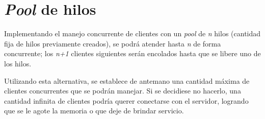 \section{\emph{Pool} de hilos}

Implementando el manejo concurrente de clientes con un \emph{pool} de \emph{n} hilos (cantidad fija de hilos previamente creados), se podrá atender hasta \emph{n} de forma concurrente; los \emph{n+1} clientes siguientes serán encolados hasta que se libere uno de los hilos. 

Utilizando esta alternativa, se establece de antemano una cantidad máxima de clientes concurrentes que se podrán manejar. Si se decidiese no hacerlo, una cantidad infinita de clientes podría querer conectarse con el servidor, logrando que se le agote la memoria o que deje de brindar servicio.








\clearpage
\printbibliography



